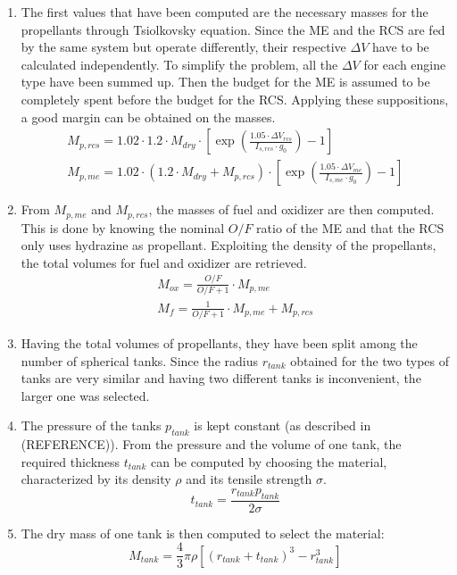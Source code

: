 \begin{enumerate}[itemsep=5mm]
    \item
    The first values that have been computed are the necessary masses for the propellants through Tsiolkovsky equation. Since the ME and the RCS are fed by the same system but operate differently, their respective $\Delta V$ have to be calculated independently. To simplify the problem, all the $\Delta V$ for each engine type have been summed up. Then the budget for the ME is assumed to be completely spent before the budget for the RCS. Applying these suppositions, a good margin can be obtained on the masses.
    \begin{gather}
        M_{p,rcs} = 1.02 \cdot 1.2 \cdot M_{dry} \cdot \left[ \exp \left( \frac{1.05 \cdot \Delta V_{rcs}}{I_{s,rcs} \cdot g_0} \right) - 1 \right]
        \\
        M_{p,me} = 1.02 \cdot \left( 1.2 \cdot M_{dry} + M_{p,rcs} \right) \cdot \left[ \exp \left( \frac{1.05 \cdot \Delta V_{me}}{I_{s,me} \cdot g_0} \right) - 1 \right]
    \end{gather}

    \item
    From $M_{p,me}$ and $M_{p,rcs}$, the masses of fuel and oxidizer are then computed. This is done by knowing the nominal $O/F$ ratio of the ME \cite{Leros} and that the RCS only uses hydrazine as propellant.
    Exploiting the density of the propellants, the total volumes for fuel and oxidizer are retrieved.
    \begin{gather}
        M_{ox} = \frac{O/F}{O/F + 1} \cdot M_{p,me}
        \\
        M_{f} = \frac{1}{O/F + 1} \cdot M_{p,me} + M_{p,rcs}
    \end{gather}

    \item
    Having the total volumes of propellants, they have been split among the number of spherical tanks. Since the radius $r_{tank}$ obtained for the two types of tanks are very similar and having two different tanks is inconvenient, the larger one was selected.

    \item
    The pressure of the tanks $p_{tank}$ is kept constant (as described in (REFERENCE)). From the pressure and the volume of one tank, the required thickness $t_{tank}$ can be computed by choosing the material, characterized by its density $\rho$ and its tensile strength $\sigma$.
    \begin{equation}
        t_{tank} = \frac{r_{tank} p_{tank}}{2 \sigma}
    \end{equation}

    \item
    The dry mass of one tank is then computed to select the material:
    \begin{equation}
        M_{tank} = \frac{4}{3} \pi \rho \left[ \left( r_{tank} + t_{tank} \right)^3 - r_{tank}^3 \right]
    \end{equation}
\end{enumerate}

